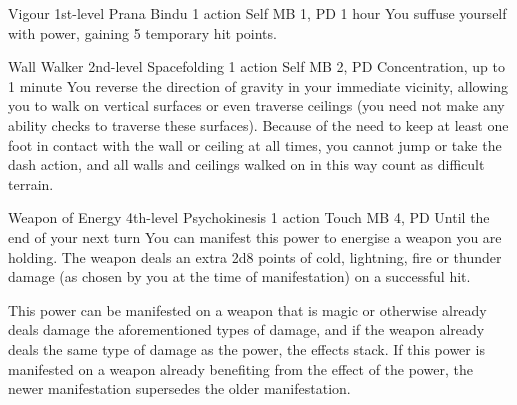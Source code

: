 \DndPowerHeader%
  {Vigour}
  {1st-level Prana Bindu}
  {1 action}
  {Self}
  {MB 1, PD \lvlone}
  {1 hour}
You suffuse yourself with power,
gaining 5 temporary hit points.

\DndPowerHeader%
  {Wall Walker}
  {2nd-level Spacefolding}
  {1 action}
  {Self}
  {MB 2, PD \lvltwo}
  {Concentration, up to 1 minute}
  You reverse the direction of gravity in your immediate vicinity,
  allowing you to walk on vertical surfaces
  or even traverse ceilings
  (you need not make any ability checks to traverse these surfaces).
  Because of the need to keep at least one foot in contact
  with the wall or ceiling at all times,
  you cannot jump or take the dash action,
  and all walls and ceilings walked on in this way count as
  difficult terrain.

\DndPowerHeader%
  {Weapon of Energy}
  {4th-level Psychokinesis}
  {1 action}
  {Touch}
  {MB 4, PD \lvlfour}
  {Until the end of your next turn}
  You can manifest this power to
  energise a weapon you are holding.
  The weapon deals an extra 2d8 points of cold,
  lightning, fire or thunder damage
  (as chosen by you at the time of manifestation)
  on a successful hit.

  This power can be manifested on a weapon that
  is magic or otherwise already deals damage the
  aforementioned types of damage,
  and if the weapon already deals the same type of damage
  as the power,
  the effects stack.
  If this power is manifested on a weapon
  already benefiting from the effect of the power,
  the newer manifestation supersedes the older manifestation.